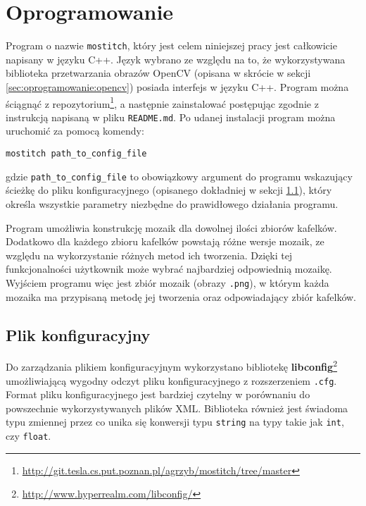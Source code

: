 %
\chapter{Oprogramowanie}
\label{sec:oprogramowanie:oprogramowanie}

Program o nazwie \texttt{mostitch}, który jest celem niniejszej pracy jest całkowicie napisany w języku C++. Język wybrano ze względu na to, że wykorzystywana biblioteka przetwarzania obrazów OpenCV (opisana w skrócie w sekcji \ref{sec:oprogramowanie:opencv}) posiada interfejs w języku C++. Program można ściągnąć z repozytorium\footnote{\url{http://git.tesla.cs.put.poznan.pl/agrzyb/mostitch/tree/master}}, a następnie zainstalować postępując zgodnie z instrukcją napisaną w pliku \texttt{README.md}. Po udanej instalacji program można uruchomić za pomocą komendy:

\begin{verbatim}
mostitch path_to_config_file
\end{verbatim}

gdzie \texttt{path\_to\_config\_file} to obowiązkowy argument do programu wskazujący ścieżkę do pliku konfiguracyjnego (opisanego dokładniej w sekcji \ref{sec:oprogramowanie:plik_konfiguracyjny}), który określa wszystkie parametry niezbędne do prawidłowego działania programu.

Program umożliwia konstrukcję mozaik dla dowolnej ilości zbiorów kafelków. Dodatkowo dla każdego zbioru kafelków powstają różne wersje mozaik, ze względu na wykorzystanie różnych metod ich tworzenia. Dzięki tej funkcjonalności użytkownik może wybrać najbardziej odpowiednią mozaikę. Wyjściem programu więc jest zbiór mozaik (obrazy \texttt{.png}), w którym każda mozaika ma przypisaną metodę jej tworzenia oraz odpowiadający zbiór kafelków.

\section{Plik konfiguracyjny}
\label{sec:oprogramowanie:plik_konfiguracyjny}

Do zarządzania plikiem konfiguracyjnym wykorzystano bibliotekę \textbf{libconfig}\footnote{\url{http://www.hyperrealm.com/libconfig/}} umożliwiającą wygodny odczyt pliku konfiguracyjnego z rozszerzeniem \texttt{.cfg}. Format pliku konfiguracyjnego jest bardziej czytelny w porównaniu do powszechnie wykorzystywanych plików XML. Biblioteka również jest świadoma typu zmiennej przez co unika się konwersji typu \texttt{string} na typy takie jak \texttt{int}, czy \texttt{float}.

